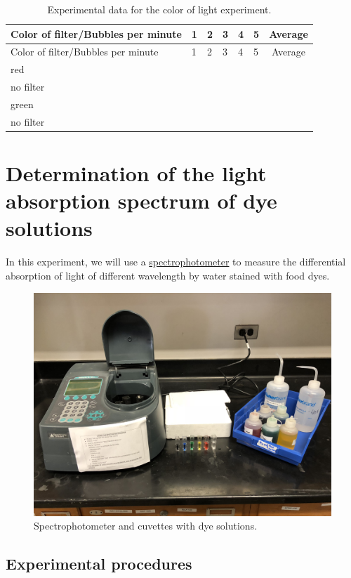 \begin{longtable}[]{@{}llllllc@{}}
\caption{\label{tab:color} Experimental data for the color of light
experiment.}\tabularnewline
\toprule
Color of filter/Bubbles per minute & 1 & 2 & 3 & 4 & 5 &
Average\tabularnewline
\midrule
\endfirsthead
\toprule
Color of filter/Bubbles per minute & 1 & 2 & 3 & 4 & 5 &
Average\tabularnewline
\midrule
\endhead
red & & & & & &\tabularnewline
no filter & & & & & &\tabularnewline
green & & & & & &\tabularnewline
no filter & & & & & &\tabularnewline
\bottomrule
\end{longtable}

\section{Determination of the light absorption spectrum of dye
solutions}\label{determination-of-the-light-absorption-spectrum-of-dye-solutions}

In this experiment, we will use a
\href{https://en.wikipedia.org/wiki/Spectrophotometry}{spectrophotometer}
to measure the differential absorption of light of different wavelength
by water stained with food dyes.

\begin{figure}

{\centering \includegraphics[width=0.7\linewidth]{./figures/photosynthesis/spectrophotometer}

}

\caption{Spectrophotometer and cuvettes with dye solutions.}\label{fig:spectrophotometer}
\end{figure}

\subsection{Experimental procedures}\label{experimental-procedures-23}

